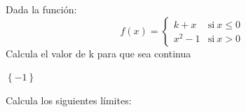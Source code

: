 \documentclass[addpoints,spanish, 12pt,a4paper]{exam}
\begin{document}
\begin{questions}


\question[1] Dada la función: $$f(x)=\begin{cases} k + x & \text{si}\: x \leq 0 \\x^{2} - 1 & \text{si}\: x>0 \end{cases}$$
        Calcula el valor de k para que sea continua \begin{solution}   $\left\{-1\right\}$   \end{solution} 
        
\question Calcula los siguientes límites:
\end{questions}
\end{document}
